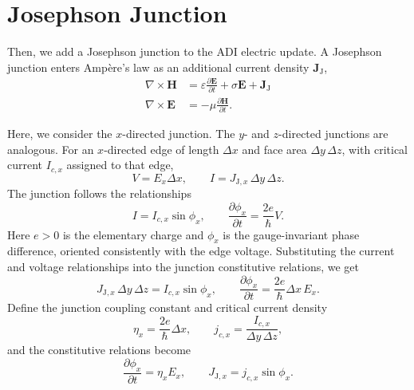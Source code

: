 \documentclass{article}
\numberwithin{equation}{section}
\numberwithin{figure}{section}
\begin{document}
\section{Josephson Junction}

Then, we add a Josephson junction to the ADI electric update. A Josephson junction enters Amp\`ere's law as an additional current density $\mathbf{J}_\mathrm{J}$,
\begin{subequations}\label{eq:maxwell-josephson}
    \begin{align}
        \nabla \times \mathbf{H} & = \varepsilon \frac{\partial \mathbf{E}}{\partial t} + \sigma \mathbf{E} + \mathbf{J}_\mathrm{J}
        \label{eq:maxwell-ampere-josephson}                                                                                         \\
        \nabla \times \mathbf{E} & = -\mu \frac{\partial \mathbf{H}}{\partial t}.
        \label{eq:maxwell-faraday-josephson}
    \end{align}
\end{subequations}

Here, we consider the $x$-directed junction. The $y$- and $z$-directed junctions are analogous. For an $x$-directed edge of length $\Delta x$ and face area $\Delta y\,\Delta z$, with critical current $I_{c,x}$ assigned to that edge,
\begin{equation}
    V = E_x\Delta x, \qquad I = J_{\mathrm{J},x}\,\Delta y\,\Delta z.
\end{equation}
The junction follows the relationships
\begin{equation}
    I = I_{c,x}\sin\phi_x, \qquad \frac{\partial\phi_x}{\partial t} = \frac{2e}{\hbar}V.
\end{equation}
Here $e>0$ is the elementary charge and $\phi_x$ is the gauge-invariant phase difference, oriented consistently with the edge voltage. Substituting the current and voltage relationships into the junction constitutive relations, we get
\begin{equation}\label{eq:josephson-constitutive}
    J_{\mathrm{J},x}\,\Delta y\,\Delta z = I_{c,x}\sin\phi_x, \qquad \frac{\partial\phi_x}{\partial t} = \frac{2e}{\hbar}\Delta x\,E_x.
\end{equation}
Define the junction coupling constant and critical current density
\begin{equation}\label{eq:josephson-coupling}
    \eta_x = \frac{2e}{\hbar}\Delta x, \qquad j_{c,x} = \frac{I_{c,x}}{\Delta y\,\Delta z},
\end{equation}
and the constitutive relations become
\begin{equation}\label{eq:josephson-phase}
    \frac{\partial\phi_x}{\partial t} = \eta_x E_x, \qquad J_{\mathrm{J},x} = j_{c,x}\sin\phi_x.
\end{equation}
\end{document}

